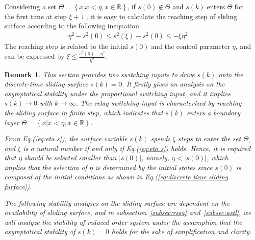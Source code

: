 \documentclass[10pt,final,journal]{IEEEtran}
\newtheorem{myrem}{Remark}
\begin{document}
	Considering a set $\Theta=\left\{x\left\vert x<\eta,x\in \mathbb{R}\right.\right\}$, if $s(0)\notin\Theta$ and $s(k)$ enters $\Theta$ for the first time at step $\xi+1$ , it is easy to calculate the reaching step of sliding surface according to the following inequation 
	\begin{align}\label{eq:eta s}
		\eta^2-s^2(0)\le s^2(\xi)-s^2(0)\le -\xi\eta^2
	\end{align}
	The reaching step is related to the initial $s(0)$ and the control parameter $\eta$, and can be expressed by $\xi\le\frac{s^2(0)-\eta^2}{\eta^2}$.
	\begin{myrem}
		This section provides two switching inputs to drive $s(k)$ onto the discrete-time sliding surface $s(k)=0$. It firstly gives an analysis on the asymptotical stability under the proportional switching input, and it implies $s(k)\to 0$ with $k\to\infty$. The relay switching input is characterized by reaching the sliding surface in finite step, which indicates that $s(k)$ enters a boundary layer $\Theta=\left\{x\left\vert x<\eta,x\in \mathbb{R}\right.\right\}$. 
		
		 From Eq.(\ref{eq:eta s}), the surface variable $s(k)$ spends $\xi$ steps to enter the set $\Theta$, and $\xi$ is a natural number if and only if Eq.(\ref{eq:eta s}) holds. Hence, it is required that $\eta$ should be selected smaller than $\vert s(0)\vert$, namely, $\eta<\vert s(0)\vert$, which implies that the selection of $\eta$ is determined by the initial states since $s(0)$ is composed of the initial conditions as shown in Eq.(\ref{eq:discrete time sliding furface}).
		
		The following stability analyses on the sliding surface are dependent on the availability of sliding surface, and in subsection~\ref{subsec:rssa} and~\ref{subsec:astl}, we will analyze the stability of reduced order system under the assumption that the asymptotical stability of $s(k)=0$ holds for the sake of simplification and clarity.
	\end{myrem}

\end{document}
